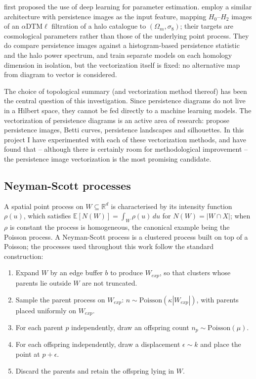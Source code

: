 \documentclass[11pt,a4paper]{article}
\newcommand{\R}{\mathbb{R}}
\newcommand{\E}{\mathbb{E}}
\begin{document}
\citet{vihrs2022neural} first proposed the use of deep learning for parameter
estimation. \citet{yip2025learning} employ a similar architecture with
persistence images as the input feature, mapping $H_0$--$H_2$ images of an
$\alpha\mathrm{DTM}\ell$ filtration of a halo catalogue to
$(\Omega_m,\sigma_8)$; their targets are cosmological parameters rather than those of the underlying point process. They do compare persistence images against a histogram-based persistence statistic and the halo power spectrum, and train separate models on each homology dimension in isolation, but the vectorization itself is fixed: no alternative map from diagram to vector is considered.

The choice of topological summary (and vectorization method thereof) has been the central question of this investigation. Since persistence diagrams do not live in a Hilbert space, they cannot be fed directly to a machine learning models. The vectorization of persistence diagrams is an active area of research: \citet{adams2017persistence} propose persistence
images, \citet{umeda2017time} Betti curves, \citet{bubenik2015landscapes}
persistence landscapes and \citet{chazal2014silhouette} silhouettes. In this project I have experimented with each of these vectorization methods, and have found that -- although there is certainly room for methodological improvement -- the persistence image vectorization is the most promising candidate.

\subsection{Neyman-Scott processes}
\label{ssec:spp}

A spatial point process on $W \subseteq \R^d$ is characterised by its intensity
function $\rho(u)$, which satisfies $\E[N(W)] = \int_W \rho(u)\,du$ for
$N(W) = |W \cap X|$; when $\rho$ is constant the process is homogeneous, the
canonical example being the Poisson process. A Neyman-Scott process is a
clustered process built on top of a Poisson; the processes used throughout this work follow the standard construction:
\begin{enumerate}
    \item Expand $W$ by an edge buffer $b$ to produce $W_{exp}$, so that
    clusters whose parents lie outside $W$ are not truncated.
    \item Sample the parent process on $W_{exp}$:
    $n \sim \mathrm{Poisson}(\kappa|W_{exp}|)$, with parents placed uniformly
    on $W_{exp}$.
    \item For each parent $p$ independently, draw an offspring count
    $n_p \sim \mathrm{Poisson}(\mu)$.
    \item For each offspring independently, draw a displacement
    $\epsilon \sim k$ and place the point at $p + \epsilon$.
    \item Discard the parents and retain the offspring lying in $W$.
\end{enumerate}
\end{document}

